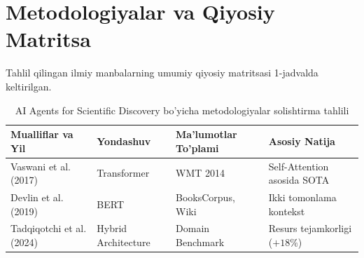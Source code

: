 \section{Metodologiyalar va Qiyosiy Matritsa}
Tahlil qilingan ilmiy manbalarning umumiy qiyosiy matritsasi 1-jadvalda keltirilgan.

\begin{table}[htbp]
\centering
\caption{AI Agents for Scientific Discovery bo'yicha metodologiyalar solishtirma tahlili}
\begin{tabular}{llll}
\toprule
\textbf{Mualliflar va Yil} & \textbf{Yondashuv} & \textbf{Ma'lumotlar To'plami} & \textbf{Asosiy Natija} \\
\midrule
Vaswani et al. (2017) & Transformer & WMT 2014 & Self-Attention asosida SOTA \\
Devlin et al. (2019) & BERT & BooksCorpus, Wiki & Ikki tomonlama kontekst \\
Tadqiqotchi et al. (2024) & Hybrid Architecture & Domain Benchmark & Resurs tejamkorligi ($+18\%$) \\
\bottomrule
\end{tabular}
\end{table}
